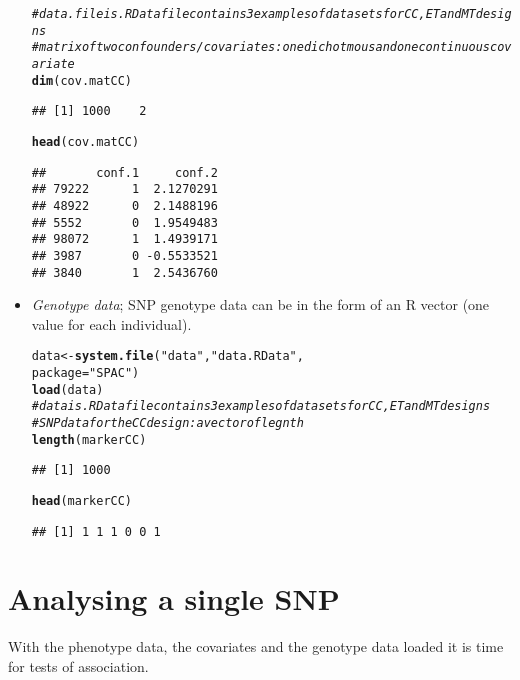 \documentclass{article}\usepackage[]{graphicx}\usepackage[]{color}
\makeatletter
\newcommand{\hlstr}[1]{\textcolor[rgb]{0.192,0.494,0.8}{#1}}%
\newcommand{\hlcom}[1]{\textcolor[rgb]{0.678,0.584,0.686}{\textit{#1}}}%
\newcommand{\hlstd}[1]{\textcolor[rgb]{0.345,0.345,0.345}{#1}}%
\newcommand{\hlkwb}[1]{\textcolor[rgb]{0.69,0.353,0.396}{#1}}%
\newcommand{\hlkwc}[1]{\textcolor[rgb]{0.333,0.667,0.333}{#1}}%
\newcommand{\hlkwd}[1]{\textcolor[rgb]{0.737,0.353,0.396}{\textbf{#1}}}%
\newenvironment{kframe}{%
 \def\at@end@of@kframe{}%
 \ifinner\ifhmode%
  \def\at@end@of@kframe{\end{minipage}}%
  \begin{minipage}{\columnwidth}%
 \fi\fi%
 \def\FrameCommand##1{\hskip\@totalleftmargin \hskip-\fboxsep
 \colorbox{shadecolor}{##1}\hskip-\fboxsep
     \hskip-\linewidth \hskip-\@totalleftmargin \hskip\columnwidth}%
 \MakeFramed {\advance\hsize-\width
   \@totalleftmargin\z@ \linewidth\hsize
   \@setminipage}}%
 {\par\unskip\endMakeFramed%
 \at@end@of@kframe}
\newenvironment{knitrout}{}{} %
\makeatother
\begin{document}
\begin{itemize}
\begin{knitrout}
\begin{kframe}
\begin{alltt}
\hlcom{# data.file is .RData file contains 3 examples of data sets for CC, ET and MT designs}
\hlcom{# matrix of two confounders/covariates: one dichotmous and one continuous covariate}
  \hlkwd{dim}\hlstd{(cov.matCC)}
\end{alltt}
\begin{verbatim}
## [1] 1000    2
\end{verbatim}
\begin{alltt}
  \hlkwd{head}\hlstd{(cov.matCC)}
\end{alltt}
\begin{verbatim}
##       conf.1     conf.2
## 79222      1  2.1270291
## 48922      0  2.1488196
## 5552       0  1.9549483
## 98072      1  1.4939171
## 3987       0 -0.5533521
## 3840       1  2.5436760
\end{verbatim}
\end{kframe}
\end{knitrout}
\item \emph{Genotype data}; SNP genotype data can be in the form of
  an R vector (one value for each individual).
\begin{knitrout}
\color{fgcolor}\begin{kframe}
\begin{alltt}
  \hlstd{data} \hlkwb{<-} \hlkwd{system.file}\hlstd{(}\hlstr{"data"}\hlstd{,} \hlstr{"data.RData"}\hlstd{,}
                         \hlkwc{package}\hlstd{=}\hlstr{"SPAC"}\hlstd{)}
  \hlkwd{load}\hlstd{(data)}
\hlcom{# data is .RData file contains 3 examples of data sets for CC, ET and MT designs}
\hlcom{# SNP data for the CC design: a vector of legnth}
  \hlkwd{length}\hlstd{(markerCC)}
\end{alltt}
\begin{verbatim}
## [1] 1000
\end{verbatim}
\begin{alltt}
  \hlkwd{head}\hlstd{(markerCC)}
\end{alltt}
\begin{verbatim}
## [1] 1 1 1 0 0 1
\end{verbatim}
\end{kframe}
\end{knitrout}
\end{itemize}

\section{Analysing a single SNP}
\label{sec:analys-single-SNP}
With the phenotype data, the covariates and the genotype data loaded it is time for tests of association.
\end{document}
